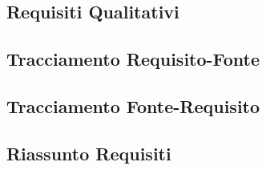\documentclass[a4paper,titlepage]{article}
\begin{document}
\newpage
\subsection{Requisiti Qualitativi}
\label{sub:Requisiti Qualitativi}


\newpage
\subsection{Tracciamento Requisito-Fonte}
\label{sub:Tracciamento Requisito-Fonte}


\newpage
\subsection{Tracciamento Fonte-Requisito}
\label{sub:Tracciamento Fonte-Requisito}


\newpage
\subsection{Riassunto Requisiti}
\label{sub:Riassunto Requisiti}

\end{document}
